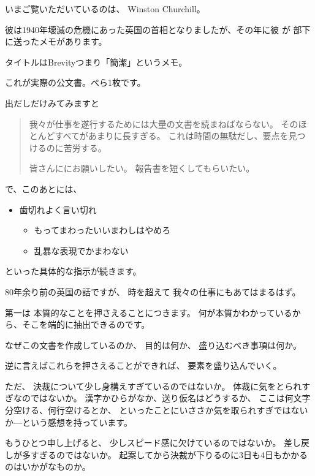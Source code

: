 \documentclass[uplatex,jis2004,dvipdfmx,12pt]{jsarticle}
\begin{document}
いまご覧いただいているのは、
Winston Churchill。

彼は1940年壊滅の危機にあった英国の首相となりましたが、その年に彼
が
部下に送ったメモがあります。

タイトルはBrevityつまり「簡潔」というメモ。

これが実際の公文書。ぺら1枚です。

出だしだけみてみますと

\begin{quote}
我々が仕事を遂行するためには大量の文書を読まねばならない。
そのほとんどすべてがあまりに長すぎる。
これは時間の無駄だし、要点を見つけるのに苦労する。

皆さんににお願いしたい。
報告書を短くしてもらいたい。
\end{quote}

で、このあとには、
\begin{itemize}
 \item 歯切れよく言い切れ
       \begin{itemize}
       \item もってまわったいいまわしはやめろ
       \item 乱暴な表現でかまわない
       \end{itemize}

\end{itemize}
といった具体的な指示が続きます。



80年余り前の英国の話ですが、
時を超えて
我々の仕事にもあてはまるはず。

第一は
本質的なことを押さえることにつきます。
何が本質かわかっているから、そこを端的に抽出できるのです。


なぜこの文書を作成しているのか、
目的は何か、
盛り込むべき事項は何か。

逆に言えばこれらを押さえることができれば、
要素を盛り込んでいく。



ただ、
決裁について少し身構えすぎているのではないか。
体裁に気をとられすぎなのではないか。
漢字かひらがなか、送り仮名はどうするか、
ここは何文字分空ける、何行空けるとか、
といったことにいささか気を取られすぎではないか---という感想を持っています。


もうひとつ申し上げると、
少しスピード感に欠けているのではないか。
差し戻しが多すぎるのではないか。
起案してから決裁が下りるのに3日も4日もかかるのはいかがなものか。
\end{document}
